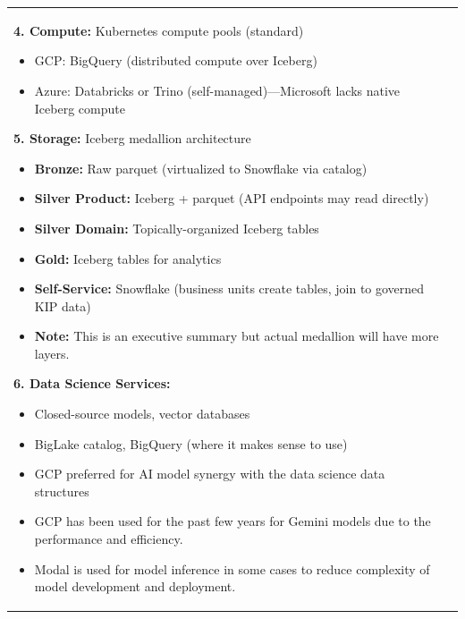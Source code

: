 \documentclass[10pt, a4paper]{article}
\begin{document}
{\begin{tabular}[t]{@{}p{}@{\hspace{0.02\textwidth}}p{}@{}}
{\vspace{0.15em}

\textbf{4. Compute:} Kubernetes compute pools (standard)
\begin{itemize}[leftmargin=1em, itemsep=0em]
    \item GCP: BigQuery (distributed compute over Iceberg)
    \item Azure: Databricks or Trino (self-managed)---Microsoft lacks native Iceberg compute
\end{itemize}

\vspace{0.15em}

\textbf{5. Storage:} Iceberg medallion architecture
\begin{itemize}[leftmargin=1em, itemsep=0em]
    \item \textbf{Bronze:} Raw parquet (virtualized to Snowflake via catalog)
    \item \textbf{Silver Product:} Iceberg + parquet (API endpoints may read directly)
    \item \textbf{Silver Domain:} Topically-organized Iceberg tables
    \item \textbf{Gold:} Iceberg tables for analytics
    \item \textbf{Self-Service:} Snowflake (business units create tables, join to governed KIP data)
    \item \textbf{Note:} This is an executive summary but actual medallion will have more layers.
\end{itemize}

\vspace{0.15em}

\textbf{6. Data Science Services:}
\begin{itemize}[leftmargin=1em, itemsep=0em]
    \item Closed-source models, vector databases
    \item BigLake catalog, BigQuery (where it makes sense to use)
    \item GCP preferred for AI model synergy with the data science data structures
    \item GCP has been used for the past few years for Gemini models due to the performance and efficiency.
    \item Modal is used for model inference in some cases to reduce complexity of model development and deployment.
\end{itemize}
}

\vspace{0.3em}


\end{tabular}}
\end{document}
